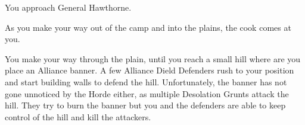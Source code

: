 You approach General Hawthorne.












As you make your way out of the camp and into the plains, the cook comes at you.


You make your way through the plain, until you reach a small hill where are you place an Alliance banner. A few Alliance Dield Defenders rush to your position and start building walls to defend the hill.  Unfortunately, the banner has not gone unnoticed by the Horde either, as multiple Desolation Grunts attack the hill. They try to burn the banner but you and the defenders are able to keep control of the hill and kill the attackers.


